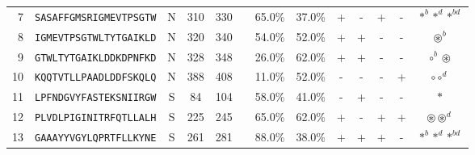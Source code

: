 \begin{tabular}{rcccccccccccc}
7  &  \texttt{SASAFFGMSRIGMEVTPSGTW} &       N &    310 &   330 &                &                          65.0\% &                           37.0\% &          + &           - &          + &           - &                                                                                                        $ \ast^b \ast^d \ast^{bd} $ \\
8  &  \texttt{IGMEVTPSGTWLTYTGAIKLD} &       N &    320 &   340 &                &                          54.0\% &                           52.0\% &          + &           + &          - &           - &                                                                                                                  $ \circledast^b $ \\
9  &  \texttt{GTWLTYTGAIKLDDKDPNFKD} &       N &    328 &   348 &                &                          26.0\% &                           62.0\% &          + &           + &          - &           - &                                                                                                            $ \circ^b \circledast $ \\
10 &  \texttt{KQQTVTLLPAADLDDFSKQLQ} &       N &    388 &   408 &                &                          11.0\% &                           52.0\% &          - &           - &          - &           + &                                                                                                                  $ \circ \circ^d $ \\
11 &  \texttt{LPFNDGVYFASTEKSNIIRGW} &       S &     84 &   104 &                &                          58.0\% &                           41.0\% &          - &           + &          - &           - &                                                                                                                           $ \ast $ \\
12 &  \texttt{PLVDLPIGINITRFQTLLALH} &       S &    225 &   245 &                &                          65.0\% &                           62.0\% &          + &           - &          + &           + &                                                                                                      $ \circledast \circledast^d $ \\
13 &  \texttt{GAAAYYVGYLQPRTFLLKYNE} &       S &    261 &   281 &                &                          88.0\% &                           38.0\% &          + &           + &          + &           - &                                                                                                        $ \ast^b \ast^d \ast^{bd} $ \\

\end{tabular}

